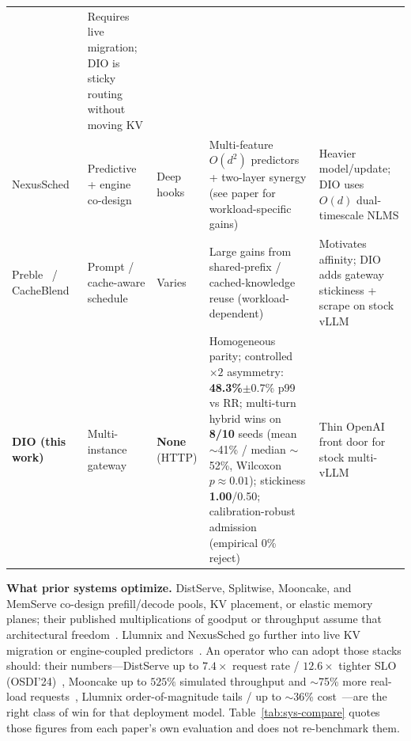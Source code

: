 \documentclass[pdflatex,sn-mathphys-num]{sn-jnl}
\begin{document}
\begin{table}[ht]
\begin{tabular}{@{}p{1.55cm}p{2.0cm}p{1.35cm}p{3.55cm}p{3.7cm}@{}}
  & Requires live migration; DIO is sticky routing without moving KV \\
NexusSched~\cite{nexussched}
  & Predictive + engine co-design
  & Deep hooks
  & Multi-feature $O(d^2)$ predictors + two-layer synergy (see paper for workload-specific gains)
  & Heavier model/update; DIO uses $O(d)$ dual-timescale NLMS \\
Preble~\cite{preble} / CacheBlend~\cite{cacheblend}
  & Prompt / cache-aware schedule
  & Varies
  & Large gains from shared-prefix / cached-knowledge reuse (workload-dependent)
  & Motivates affinity; DIO adds gateway stickiness + scrape on stock vLLM \\
\midrule
\textbf{DIO (this work)}
  & Multi-instance gateway
  & \textbf{None} (HTTP)
  & Homogeneous parity; controlled $\times 2$ asymmetry: \textbf{48.3\%}$\pm$0.7\% p99 vs RR; multi-turn hybrid wins on \textbf{8/10} seeds (mean $\sim$41\% / median $\sim$52\%, Wilcoxon $p{\approx}0.01$); stickiness \textbf{1.00}/0.50; calibration-robust admission (empirical 0\% reject)
  & Thin OpenAI front door for stock multi-vLLM \\
\bottomrule
\end{tabular}
\end{table}

\textbf{What prior systems optimize.}
DistServe, Splitwise, Mooncake, and MemServe co-design prefill/decode pools, KV
placement, or elastic memory planes; their published multiplications of goodput or
throughput assume that architectural freedom~\cite{distserve,splitwise,mooncake,memserve}.
Llumnix and NexusSched go further into live KV migration or engine-coupled
predictors~\cite{llumnix,nexussched}. An operator who can adopt those stacks should:
their numbers---DistServe up to $7.4\times$ request rate / $12.6\times$ tighter SLO
(OSDI'24)~\cite{distserve}, Mooncake up to $525\%$ simulated throughput and
$\sim$75\% more real-load requests~\cite{mooncake}, Llumnix order-of-magnitude
tails / up to $\sim$36\% cost~\cite{llumnix}---are the right class of win for that
deployment model. Table~\ref{tab:sys-compare} quotes those figures from each paper's
own evaluation and does not re-benchmark them.
\end{document}
